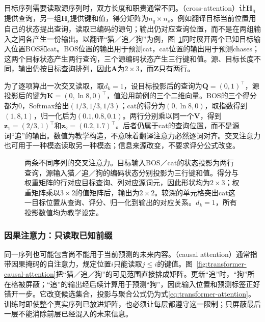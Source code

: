 目标序列需要读取源序列时，双方长度和职责通常不同。（cross-attention）让$\bm H_{\mathrm q}$提供查询，另一组$\bm H_{\mathrm s}$提供键和值，得分矩阵为$n_q\times n_s$。例如翻译目标当前位置用自己的状态提出查询，读取已编码的源句；输出仍对应查询位置，而不是在两组输入之间各产生一份输出。以翻译“猫／追／狗”为例，图~\ref{fig:transformer-cross-attention}同时展开两个已知目标输入位置BOS和cat。BOS位置的输出用于预测cat，cat位置的输出用于预测chases；这两个目标状态产生两行查询，三个源编码状态产生三行键和值。源、目标长度不同，输出仍按目标查询排列，因此$\bm A$为$2\times3$，而$\bm Z$只有两行。

为了逐项算出一次交叉读取，取$d_k=1$，设目标投影后的查询为$\bm Q=(0,1)^{\top}$，源投影后的键为$\bm K=(0,\ln8,0)^{\top}$，值沿用前例的三个二维向量。BOS的三个得分都为0，Softmax给出$(1/3,1/3,1/3)$；cat的得分为$(0,\ln8,0)$，取指数得到$(1,8,1)$，归一化后为$(0.1,0.8,0.1)$。两行分别乘以同一个$\bm V$，得到$\bm z_1=(2/3,1)^{\top}$和$\bm z_2=(0.2,1.7)^{\top}$。后者仍属于cat的查询位置，而不是源词“追”的输出。数值为教学构造，不意味着翻译注意力必然逐词对齐。交叉注意力也可用于一种模态读取另一种模态；信息来源改变，不要求评分公式改变。

\begin{figure}[p]
  \centering
  
  \caption{两条不同序列的交叉注意力。目标输入BOS／cat的状态投影为两行查询，源输入猫／追／狗的编码状态分别投影为三行键和值。得分与权重矩阵的行对应目标查询、列对应源词元，因此形状均为$2\times3$；权重矩阵乘以$3\times2$的值矩阵后，输出为$2\times2$。较深的单元格突出cat这一目标位置从查询、评分、归一化到输出的对应关系。$d_k=1$，所有投影数值均为教学设定。}
  \label{fig:transformer-cross-attention}
\end{figure}
\FloatBarrier

\subsubsection{因果注意力：只读取已知前缀}

同一序列也可能包含尚不能用于当前预测的未来内容。（causal attention）通常指带因果掩码的自注意力，规定位置$i$只能读取$j\leq i$的键值。图~\ref{fig:transformer-causal-attention}把“猫／追／狗”的可见范围直接排成矩阵。更新“追”时，“狗”所在格被屏蔽；“追”的输出经后续计算用于预测“狗”，因此输入位置和预测标签正好错开一步。它改变候选集合，投影与聚合公式仍为式\eqref{eq:transformer-attention}。训练时即使整个真实序列已放进矩阵，也必须让每层都遵守这一限制；只屏蔽最后一层不能消除前层已经混入的未来信息。

